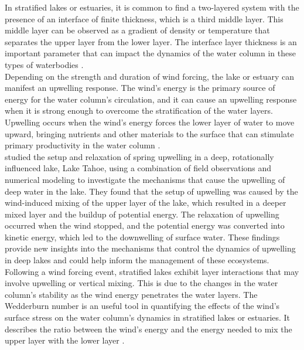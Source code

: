 \documentclass[tesis.tex]{subfiles}
\begin{document}
In stratified lakes or estuaries, it is common to find a two-layered system with the presence of an interface of finite thickness, which is a third middle layer. This middle layer can be observed as a gradient of density or temperature that separates the upper layer from the lower layer. The interface layer thickness is an important parameter that can impact the dynamics of the water column in these types of waterbodies \citep{simpson1974fronts}.\\

Depending on the strength and duration of wind forcing, the lake or estuary can manifest an upwelling response. The wind's energy is the primary source of energy for the water column's circulation, and it can cause an upwelling response when it is strong enough to overcome the stratification of the water layers. Upwelling occurs when the wind's energy forces the lower layer of water to move upward, bringing nutrients and other materials to the surface that can stimulate primary productivity in the water column \citep{macintyre2010ecosystem}. \\

\cite{roberts2021setup} studied the setup and relaxation of spring upwelling in a deep, rotationally influenced lake, Lake Tahoe, using a combination of field observations and numerical modeling to investigate the mechanisms that cause the upwelling of deep water in the lake. They found that the setup of upwelling was caused by the wind-induced mixing of the upper layer of the lake, which resulted in a deeper mixed layer and the buildup of potential energy. The relaxation of upwelling occurred when the wind stopped, and the potential energy was converted into kinetic energy, which led to the downwelling of surface water. These findings provide new insights into the mechanisms that control the dynamics of upwelling in deep lakes and could help inform the management of these ecosystems.\\

Following a wind forcing event, stratified lakes exhibit layer interactions that may involve upwelling or vertical mixing. This is due to the changes in the water column's stability as the wind energy penetrates the water layers. The Wedderburn number is an useful tool in quantifying the effects of the wind's surface stress on the water column's dynamics in stratified lakes or estuaries. It describes the ratio between the wind's energy and the energy needed to mix the upper layer with the lower layer \citep{jenkins1984response}.\\
\end{document}
